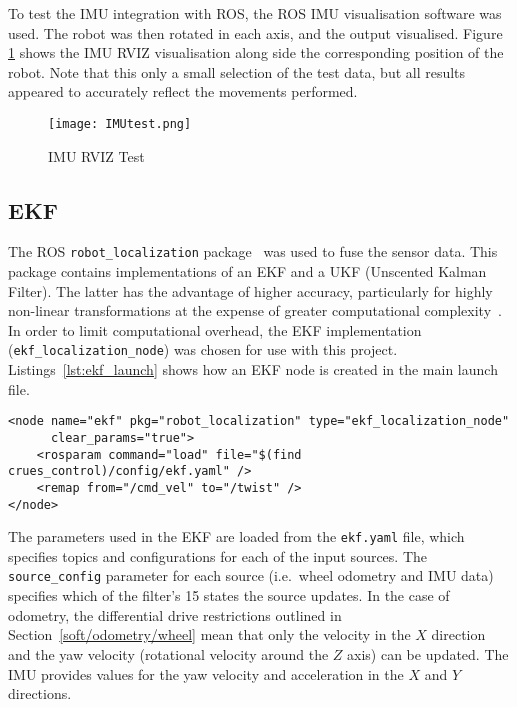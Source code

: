 To test the IMU integration with ROS, the ROS IMU visualisation software was used.
The robot was then rotated in each axis, and the output visualised.
Figure \ref{fig:imu_test} shows the IMU RVIZ visualisation along side the
corresponding position of the robot. Note that this only a small selection
of the test data, but all results appeared to accurately reflect the
movements performed.

\begin{figure}[!ht]
	\centering
	\texttt{[image: IMUtest.png]}
	\caption{IMU RVIZ Test}\label{fig:imu_test}
\end{figure}

\subsection{EKF}\label{soft/odometry/ekf}

The ROS \verb|robot_localization| package~\cite{RosRobotLocalization} was used
to fuse the sensor data. This package contains implementations of
an EKF and a UKF (Unscented Kalman Filter). The latter has the advantage of higher
accuracy, particularly for highly non-linear transformations at the expense of
greater computational complexity~\cite{wan_unscented_2000}. In order to limit
computational overhead, the EKF implementation (\verb|ekf_localization_node|) was
chosen for use with this project. Listings~\ref{lst:ekf_launch} shows how an EKF
node is created in the main launch file.

\begin{lstlisting}[caption={EKF node in ROS launch file}, label={lst:ekf_launch}, style=xml]
<node name="ekf" pkg="robot_localization" type="ekf_localization_node"
      clear_params="true">
    <rosparam command="load" file="$(find crues_control)/config/ekf.yaml" />
    <remap from="/cmd_vel" to="/twist" />
</node>
\end{lstlisting}

The parameters used in the EKF are loaded from the \verb|ekf.yaml| file, which
specifies topics and configurations for each of the input sources. The
\verb|source_config| parameter for each source (i.e.\ wheel odometry and IMU data)
specifies which of the filter's 15 states the source updates. In the case of
odometry, the differential drive restrictions outlined in
Section~\ref{soft/odometry/wheel} mean that only the velocity in the $X$ direction
and the yaw velocity (rotational velocity around the $Z$ axis) can be updated.
The IMU provides values for the yaw velocity and acceleration in the $X$ and
$Y$ directions. 

